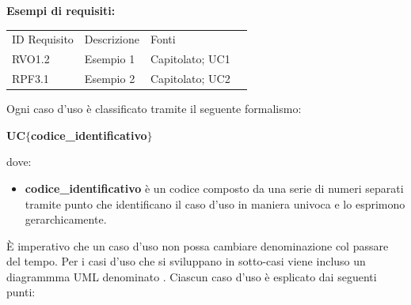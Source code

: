             \textbf{Esempi di requisiti:}

                \begin{center}
                        \begin{tabular}{ >{\centering\arraybackslash}m{3cm} m{7cm} m{3cm} >{\centering\arraybackslash}m{2.5cm} }
                            \rowcolor{gray!50}
                            ID Requisito & Descrizione & Fonti \\
                            RVO1.2 & Esempio 1 & Capitolato; UC1 \\
                            RPF3.1 & Esempio 2 & Capitolato; UC2 \\
                        \end{tabular}
                \end{center}
				

            Ogni caso d'uso è classificato tramite il seguente formalismo:

                \begin{center}
                    \textbf{UC$\{$codice\_identificativo$\}$}
                \end{center}

            dove:

                \begin{itemize}
                    \item \textbf{codice\_identificativo} è un codice composto da una serie di numeri separati tramite
                    punto che identificano il caso d'uso in maniera univoca e lo esprimono gerarchicamente.
                \end{itemize}

            È imperativo che un caso d'uso non possa cambiare denominazione col passare del tempo.
            Per i casi d'uso che si sviluppano in sotto-casi viene incluso un diagrammma UML
            denominato .
            Ciascun caso d'uso è esplicato dai seguenti punti:

